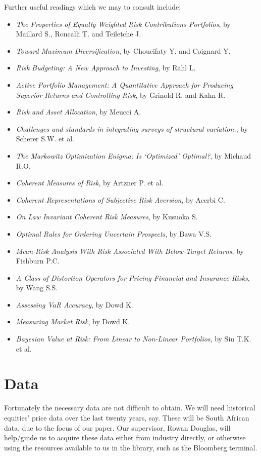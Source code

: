 \documentclass[12pt,a4paper]{article}
\newcommand{\bi}{\begin{itemize}}
\newcommand{\ei}{\end{itemize}}
\begin{document}
Further useful readings which we may to consult include: 
\bi
\item  \textit{The Properties of Equally Weighted Risk Contributions Portfolios}, by Maillard S., Roncalli T. and Teiletche J. 
\item \textit{Toward Maximum Diversification}, by Choueifaty Y. and Coignard Y.
\item \textit{Risk Budgeting: A New Approach to Investing}, by Rahl L.
\item \textit{Active Portfolio Management: A Quantitative Approach for Producing Superior Returns and Controlling Risk}, by Grinold R. and Kahn R.
\item \textit{Risk and Asset Allocation}, by Meucci A.
\item \textit{Challenges and standards in integrating surveys of structural variation.}, by Scherer S.W. et al.
\item \textit{The Markowitz Optimization Enigma: Is ‘Optimized’ Optimal?}, by Michaud R.O.
\item \textit{Coherent Measures of Risk}, by Artzner P. et al.
\item \textit{Coherent Representations of Subjective Risk Aversion}, by Acerbi C. 
\item  \textit{On Law Invariant Coherent Risk Measures}, by Kusuoka S.
\item  \textit{Optimal Rules for Ordering Uncertain Prospects}, by Bawa V.S.
\item \textit{Mean-Risk Analysis With Risk Associated With Below-Target Returns}, by Fishburn P.C.
\item  \textit{A Class of Distortion Operators for Pricing Financial and Insurance Risks}, by Wang S.S.
\item  \textit{Assessing VaR Accuracy}, by Dowd K.
\item  \textit{Measuring Market Risk}, by Dowd K. 
\item \textit{Bayesian Value at Risk: From Linear to Non-Linear Portfolios}, by Siu T.K. et al.
\ei

\section{Data}
\label{sec:Data}

Fortunately the necessary data are not difficult to obtain. We will need historical equities' price data over the last twenty years, say. These will be South African data, due to the focus of our paper. Our supervisor, Rowan Douglas, will help/guide us to acquire these data either from industry directly, or otherwise using the resources available to us in the library, such as the Bloomberg terminal. 
\end{document}
